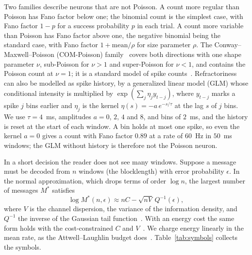 \documentclass[journal]{IEEEtran}
\begin{document}
Two families describe neurons that are not Poisson. A count more regular than Poisson has Fano factor below one; the binomial count
is the simplest case, with Fano factor $1 - p$ for a success probability $p$ in each trial. A count more variable than Poisson has Fano factor above one, the negative binomial
being the standard case, with Fano factor $1 + \text{mean}/\rho$ for size parameter $\rho$. The Conway--Maxwell--Poisson (COM-Poisson)
family~\cite{Shmueli2005} covers both directions with one shape parameter $\nu$, sub-Poisson for $\nu > 1$ and super-Poisson for
$\nu < 1$, and contains the Poisson count at $\nu = 1$; it is a standard model of spike counts~\cite{Stevenson2016}. Refractoriness can
also be modelled as spike history, by a generalized linear model (GLM) whose conditional intensity is multiplied by
$\exp(\sum_j \eta_j y_{t-j})$, where $y_{t-j}$ marks a spike $j$ bins earlier and $\eta_j$ is the kernel $\eta(s) = -a\,e^{-s/\tau}$ at the lag $s$ of $j$ bins. We use
$\tau = 4$~ms, amplitudes $a = 0$, $2$, $4$ and $8$, and bins of $2$~ms, and the history is reset at the start of each window. A bin
holds at most one spike, so even the kernel $a = 0$ gives a count with Fano factor $0.89$ at a rate of $60$~Hz in $50$~ms windows; the
GLM without history is therefore not the Poisson neuron.

In a short decision the reader does not see many windows. Suppose a message must be decoded from $n$ windows (the blocklength) with
error probability $\epsilon$. In the normal approximation, which drops terms of order $\log n$, the largest number of messages
$M^\ast$ satisfies
\begin{equation}
\log M^\ast(n, \epsilon) \approx nC - \sqrt{nV}\,Q^{-1}(\epsilon),\label{eq:ppv}
\end{equation}
where $V$ is the channel dispersion, the variance of the information density, and $Q^{-1}$ the inverse of the Gaussian tail
function~\cite{PPV2010}. With an energy cost the
same form holds with the cost-constrained $C$ and $V$~\cite{KostinaVerdu2015}. We charge energy linearly in the mean rate, as the
Attwell--Laughlin budget does~\cite{AttwellLaughlin2001}. Table~\ref{tab:symbols} collects the symbols.
\end{document}
